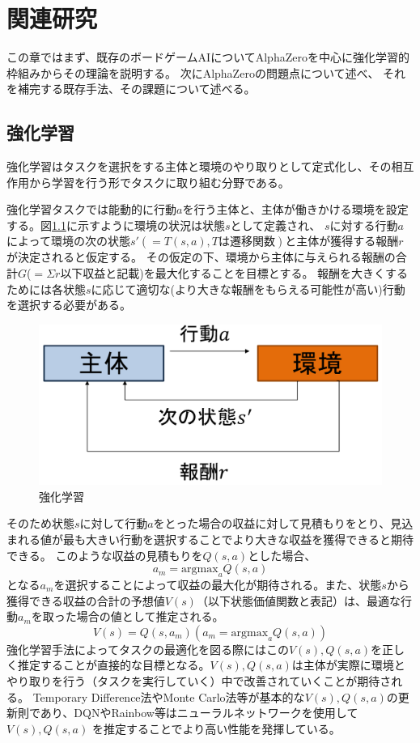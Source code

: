 \chapter{関連研究}
この章ではまず、既存のボードゲームAIについてAlphaZeroを中心に強化学習的枠組みからその理論を説明する。
次にAlphaZeroの問題点について述べ、
それを補完する既存手法、その課題について述べる。



\section{強化学習}
強化学習はタスクを選択をする主体と環境のやり取りとして定式化し、その相互作用から学習を行う形でタスクに取り組む分野である\cite{RL}。

強化学習タスクでは能動的に行動$a$を行う主体と、主体が働きかける環境を設定する。図\ref{fig:RL}に示すように環境の状況は状態$s$として定義され、
$s$に対する行動$a$によって環境の次の状態${s'}(=T(s, a), Tは遷移関数)$と主体が獲得する報酬$r$が決定されると仮定する。
その仮定の下、環境から主体に与えられる報酬の合計$G$($=\Sigma r$以下収益と記載)を最大化することを目標とする。
報酬を大きくするためには各状態$s$に応じて適切な(より大きな報酬をもらえる可能性が高い)行動を選択する必要がある。
\begin{figure}[t]
	\centering
	\includegraphics[width=\linewidth]{./figure/RL.png}
	\caption{強化学習}
	\label{fig:RL}
\end{figure}
そのため状態$s$に対して行動$a$をとった場合の収益に対して見積もりをとり、見込まれる値が最も大きい行動を選択することでより大きな収益を獲得できると期待できる。
このような収益の見積もりを$Q(s, a)$とした場合、
\begin{equation}
	{\displaystyle a_m = {\textrm{argmax}}_{a} Q(s, a)}
\end{equation}
となる$a_m$を選択することによって収益の最大化が期待される。また、状態$s$から獲得できる収益の合計の予想値$V(s)$（以下状態価値関数と表記）は、最適な行動$a_m$を取った場合の値として推定される。
\begin{equation}
	{\displaystyle V(s) = Q(s, a_m)(a_m = \textrm{argmax}_{a} Q(s, a))}
\end{equation}
強化学習手法によってタスクの最適化を図る際にはこの$V(s),Q(s, a)$を正しく推定することが直接的な目標となる。$V(s),Q(s, a)$は主体が実際に環境とやり取りを行う（タスクを実行していく）中で改善されていくことが期待される。
Temporary Difference法やMonte Carlo法等が基本的な$V(s),Q(s, a)$の更新則であり、DQN\cite{DQN}やRainbow\cite{rainbow}等はニューラルネットワークを使用して$V(s),Q(s, a)$
を推定することでより高い性能を発揮している。



